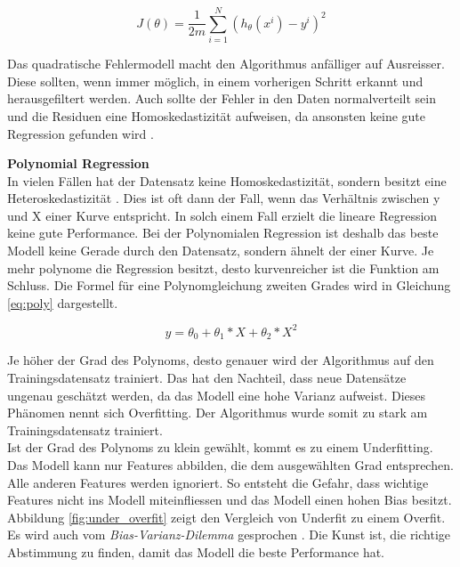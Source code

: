 \begin{equation}\label{eq:cost_function}
J(\theta) = \frac{1}{2m} \sum_{i=1}^{N} (h_\theta(x^i) - y^i)^2
\end{equation}

Das quadratische Fehlermodell macht den Algorithmus anfälliger auf Ausreisser. Diese sollten, wenn immer möglich, in einem vorherigen Schritt erkannt und herausgefiltert werden. Auch sollte der Fehler in den Daten normalverteilt sein und die Residuen eine Homoskedastizität aufweisen, da ansonsten keine gute Regression gefunden wird \cite{gradient_descent, gradient_descent_2, gradient_descent_3}.

\textbf{Polynomial Regression}\\
In vielen Fällen hat der Datensatz keine Homoskedastizität, sondern besitzt eine Heteroskedastizität \cite{poly}. Dies ist oft dann der Fall, wenn das Verhältnis zwischen y und X einer Kurve entspricht. In solch einem Fall erzielt die lineare Regression keine gute Performance.
Bei der Polynomialen Regression ist deshalb das beste Modell keine Gerade durch den Datensatz, sondern ähnelt der einer Kurve. Je mehr polynome die Regression besitzt, desto kurvenreicher ist die Funktion am Schluss. Die Formel für eine Polynomgleichung zweiten Grades wird in Gleichung \eqref{eq:poly} dargestellt.

\begin{equation}\label{eq:poly}
y = \theta_0 + \theta_1 * X + \theta_2 * X^2
\end{equation}

Je höher der Grad des Polynoms, desto genauer wird der Algorithmus auf den Trainingsdatensatz trainiert. Das hat den Nachteil, dass neue Datensätze ungenau geschätzt werden, da das Modell eine hohe Varianz aufweist. Dieses Phänomen nennt sich Overfitting. Der Algorithmus wurde somit zu stark am Trainingsdatensatz trainiert.\\
Ist der Grad des Polynoms zu klein gewählt, kommt es zu einem Underfitting. Das Modell kann nur Features abbilden, die dem ausgewählten Grad entsprechen. Alle anderen Features werden ignoriert. So entsteht die Gefahr, dass wichtige Features nicht ins Modell miteinfliessen und das Modell einen hohen Bias besitzt. Abbildung \ref{fig:under_overfit} zeigt den Vergleich von Underfit zu einem Overfit.\\
Es wird auch vom \textit{Bias-Varianz-Dilemma} gesprochen \cite{bias_variance, bias_variance_2}. Die Kunst ist, die richtige Abstimmung zu finden, damit das Modell die beste Performance hat.


